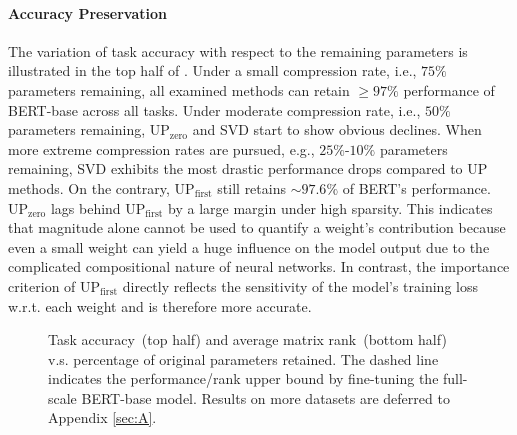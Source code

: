 

\paragraph{Accuracy Preservation} 
The variation of task accuracy with respect to the remaining parameters is illustrated 
in the top half of . Under a small compression rate, i.e., 
$75\%$  parameters remaining, all examined methods can retain $\ge 97\%$ performance 
of BERT-base across all tasks. Under moderate compression rate, i.e., $50\%$ parameters remaining, UP$_\text{zero}$ and SVD start to show obvious declines. 
When more extreme compression rates are pursued, e.g., $25\%$-$10\%$ parameters 
remaining, SVD exhibits the most drastic performance drops compared to UP methods. 
On the contrary,  UP$_\text{first}$ still retains $\sim 97.6\%$ of BERT's performance.
UP$_\text{zero}$ lags behind UP$_\text{first}$ by a large margin under high sparsity. This indicates that magnitude alone cannot be used to quantify a weight's 
contribution because even a small weight can yield a huge influence on the model 
output due to the complicated compositional nature of neural networks. 
In contrast, the importance criterion of UP$_\text{first}$ directly reflects the 
sensitivity of the model's training loss w.r.t. each weight and is therefore more 
accurate.

\begin{figure}[t]
	\centering
	\caption{Task accuracy~(top half) and average matrix rank~(bottom half) 
v.s. percentage of original parameters retained. 
The dashed line indicates the performance/rank upper bound by fine-tuning the full-scale BERT-base model. Results on more datasets are deferred to Appendix \ref{sec:A}.}
	\label{fig:pre}
\end{figure}


